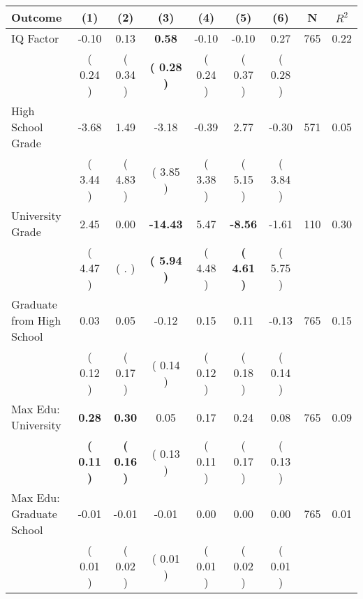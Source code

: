 \begin{tabular}{lcccccccc}
\toprule
 \textbf{Outcome} & \textbf{(1)} & \textbf{(2)} & \textbf{(3)} & \textbf{(4)} & \textbf{(5)} & \textbf{(6)} & \textbf{N} & \textbf{$ R^2$} \\
\midrule
IQ Factor &     -0.10 &      0.13 & \textbf{     0.58} &     -0.10 &     -0.10 &      0.27 & 765 &       0.22 \\ 
 & (     0.24 ) & (     0.34 ) & \textbf{(     0.28 )} & (     0.24 ) & (     0.37 ) & (     0.28 ) & \\
High School Grade &     -3.68 &      1.49 &     -3.18 &     -0.39 &      2.77 &     -0.30 & 571 &       0.05 \\ 
 & (     3.44 ) & (     4.83 ) & (     3.85 ) & (     3.38 ) & (     5.15 ) & (     3.84 ) & \\
University Grade &      2.45 &      0.00 & \textbf{   -14.43} &      5.47 & \textbf{    -8.56} &     -1.61 & 110 &       0.30 \\ 
 & (     4.47 ) & (        . ) & \textbf{(     5.94 )} & (     4.48 ) & \textbf{(     4.61 )} & (     5.75 ) & \\
Graduate from High School &      0.03 &      0.05 &     -0.12 &      0.15 &      0.11 &     -0.13 & 765 &       0.15 \\ 
 & (     0.12 ) & (     0.17 ) & (     0.14 ) & (     0.12 ) & (     0.18 ) & (     0.14 ) & \\
Max Edu: University & \textbf{     0.28} & \textbf{     0.30} &      0.05 &      0.17 &      0.24 &      0.08 & 765 &       0.09 \\ 
 & \textbf{(     0.11 )} & \textbf{(     0.16 )} & (     0.13 ) & (     0.11 ) & (     0.17 ) & (     0.13 ) & \\
Max Edu: Graduate School &     -0.01 &     -0.01 &     -0.01 &      0.00 &      0.00 &      0.00 & 765 &       0.01 \\ 
 & (     0.01 ) & (     0.02 ) & (     0.01 ) & (     0.01 ) & (     0.02 ) & (     0.01 ) & \\
\bottomrule
\end{tabular}
